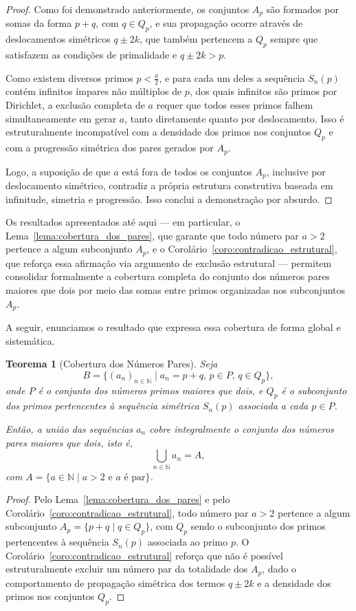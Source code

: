 \documentclass[a4paper,11pt]{article}
\newtheorem{theorem}{Teorema}[section]
\theoremstyle{definition}
\theoremstyle{remark}
\begin{document}
\begin{otherlanguage}{brazil}
\begin{proof}
		Como foi demonstrado anteriormente, os conjuntos \(A_p\) são formados por somas da forma \(p + q\), com \(q \in Q_p\), e sua propagação ocorre através de deslocamentos simétricos \(q \pm 2k\), que também pertencem a \(Q_p\) sempre que satisfazem as condições de primalidade e \(q \pm 2k > p\).
		
		Como existem diversos primos \(p < \frac{a}{2}\), e para cada um deles a sequência \(S_n(p)\) contém infinitos ímpares não múltiplos de \(p\), dos quais infinitos são primos por Dirichlet, a exclusão completa de \(a\) requer que todos esses primos falhem simultaneamente em gerar \(a\), tanto diretamente quanto por deslocamento. Isso é estruturalmente incompatível com a densidade dos primos nos conjuntos \(Q_p\) e com a progressão simétrica dos pares gerados por \(A_p\).
		
		Logo, a suposição de que \(a\) está fora de todos os conjuntos \(A_p\), inclusive por deslocamento simétrico, contradiz a própria estrutura construtiva baseada em infinitude, simetria e progressão. Isso conclui a demonstração por absurdo.
	\end{proof}
	
	Os resultados apresentados até aqui — em particular, o Lema~\ref{lema:cobertura_dos_pares}, que garante que todo número par \( a > 2 \) pertence a algum subconjunto \( A_p \), e o Corolário~\ref{coro:contradicao_estrutural}, que reforça essa afirmação via argumento de exclusão estrutural — permitem consolidar formalmente a cobertura completa do conjunto dos números pares maiores que dois por meio das somas entre primos organizadas nos subconjuntos \( A_p \).
	
	A seguir, enunciamos o resultado que expressa essa cobertura de forma global e sistemática.
	
	\begin{theorem}[Cobertura dos Números Pares]\label{teo:cobertura_dos_pares}
		Seja
		\[
		B = \{(a_n)_{n \in \mathbb{N}} \mid a_n = p + q,\, p \in P,\, q \in Q_p\},
		\]
		onde \(P\) é o conjunto dos números primos maiores que dois, e \(Q_p\) é o subconjunto dos primos pertencentes à sequência simétrica \(S_n(p)\) associada a cada \(p \in P\).
		
		Então, a união das sequências \(a_n\) cobre integralmente o conjunto dos números pares maiores que dois, isto é,
		\[
		\bigcup_{n \in \mathbb{N}} a_n = A,
		\]
		com \(A = \{a \in \mathbb{N} \mid a > 2 \text{ e } a \text{ é par} \}\).
	\end{theorem}
	\begin{proof}
		Pelo Lema~\ref{lema:cobertura_dos_pares} e pelo Corolário~\ref{coro:contradicao_estrutural}, todo número par \(a > 2\) pertence a algum subconjunto \(A_p = \{p + q \mid q \in Q_p\}\), com \(Q_p\) sendo o subconjunto dos primos pertencentes à sequência \(S_n(p)\) associada ao primo \(p\). O Corolário~\ref{coro:contradicao_estrutural} reforça que não é possível estruturalmente excluir um número par da totalidade dos \(A_p\), dado o comportamento de propagação simétrica dos termos \(q \pm 2k\) e a densidade dos primos nos conjuntos \(Q_p\).
		

\end{proof}
\end{otherlanguage}
\end{document}
